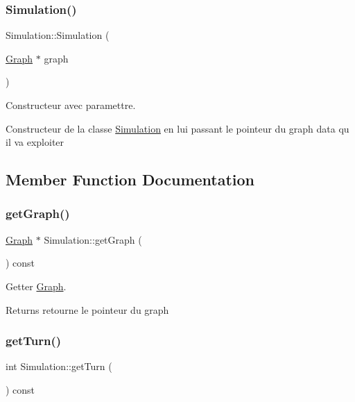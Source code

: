 \subsubsection{\texorpdfstring{Simulation()}{Simulation()}\hspace{0.1cm}{\footnotesize\ttfamily [2/2]}}
{\footnotesize\ttfamily Simulation\+::\+Simulation (\begin{DoxyParamCaption}\item[{\mbox{\hyperlink{class_graph}{Graph}} $\ast$}]{graph }\end{DoxyParamCaption})}



Constructeur avec paramettre. 

Constructeur de la classe \mbox{\hyperlink{class_simulation}{Simulation}} en lui passant le pointeur du graph data qu il va exploiter 

\subsection{Member Function Documentation}
\mbox{\label{class_simulation_a296949268560dd447dfe3b36d36610b3}} 
\subsubsection{\texorpdfstring{get\+Graph()}{getGraph()}}
{\footnotesize\ttfamily \mbox{\hyperlink{class_graph}{Graph}} $\ast$ Simulation\+::get\+Graph (\begin{DoxyParamCaption}{ }\end{DoxyParamCaption}) const}



Getter \mbox{\hyperlink{class_graph}{Graph}}. 

\begin{DoxyReturn}{Returns}
retourne le pointeur du graph 
\end{DoxyReturn}
\mbox{\label{class_simulation_a21dc3e8afd771b9bfa58f88fdce1c998}} 
\subsubsection{\texorpdfstring{get\+Turn()}{getTurn()}}
{\footnotesize\ttfamily int Simulation\+::get\+Turn (\begin{DoxyParamCaption}{ }\end{DoxyParamCaption}) const}



